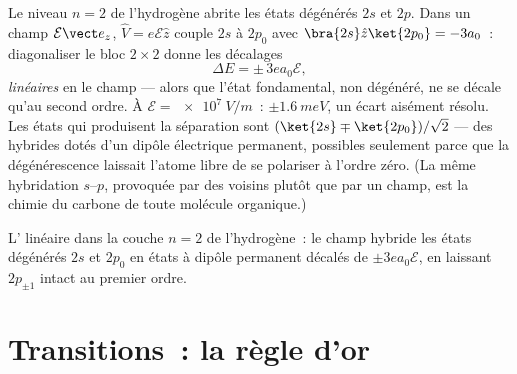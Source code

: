 \begin{example}\label{ex:b3:perturbation-theory:stark}
Le niveau $n = 2$ de l'hydrogène abrite les états dégénérés $2s$ et
$2p$. Dans un champ $\mathcal E\vect e_z$, $\hat V = e\mathcal E\hat z$
couple $2s$ à $2p_0$ avec $\bra{2s}\hat z\ket{2p_0} = -3a_0$~:
diagonaliser le bloc $2\times2$ donne les décalages
\[
\Delta E = \pm\,3e a_0\mathcal E ,
\]
\emph{linéaires} en le champ --- alors que l'état fondamental, non
dégénéré, ne se décale qu'au second ordre. À $\mathcal E = \qty{e7}{V/m}$~: $\pm
\qty{1.6}{meV}$, un écart aisément résolu. Les états qui produisent la
séparation sont $(\ket{2s} \mp \ket{2p_0})/\sqrt2$ --- des hybrides
dotés d'un dipôle électrique permanent, possibles seulement parce que
la dégénérescence laissait l'atome libre de se polariser à l'ordre
zéro. (La même hybridation $s$--$p$, provoquée par des voisins plutôt
que par un champ, est la chimie du carbone de toute molécule
organique.)
\end{example}

\begin{omfigure}

{\small L' linéaire dans la couche $n = 2$ de l'hydrogène~:
le champ hybride les états dégénérés $2s$ et $2p_0$ en états à dipôle
permanent décalés de $\pm3ea_0\mathcal E$, en laissant $2p_{\pm1}$
intact au premier ordre.}
\end{omfigure}

\section{Transitions~: la règle d'or}

